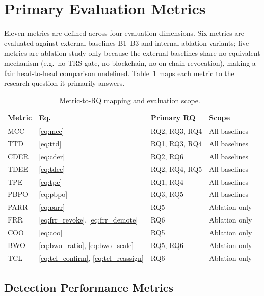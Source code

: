 \documentclass[12pt, a4paper]{report}
\begin{document}
\section{Primary Evaluation Metrics}
\label{sec:metrics}

Eleven metrics are defined across four evaluation dimensions.
Six metrics are evaluated against external baselines B1--B3 and
internal ablation variants; five metrics are ablation-study
only because the external baselines share no equivalent mechanism
(e.g.\ no TRS gate, no blockchain, no on-chain revocation), making
a fair head-to-head comparison undefined.
Table~\ref{tab:metric-rq} maps each metric to the research question
it primarily answers.

\begin{table}[H]
\centering
\caption{Metric-to-RQ mapping and evaluation scope.}
\label{tab:metric-rq}
\renewcommand{\arraystretch}{1.15}
\begin{tabular}{|l|l|l|l|}
\hline
\textbf{Metric} & \textbf{Eq.} & \textbf{Primary RQ} & \textbf{Scope} \\
\hline
MCC   & \ref{eq:mcc}          & RQ2, RQ3, RQ4        & All baselines \\
\hline
TTD   & \ref{eq:ttd}          & RQ1, RQ3, RQ4        & All baselines \\
\hline
CDER  & \ref{eq:cder}         & RQ2, RQ6             & All baselines \\
\hline
TDEE  & \ref{eq:tdee}         & RQ2, RQ4, RQ5        & All baselines \\
\hline
TPE   & \ref{eq:tpe}          & RQ1, RQ4             & All baselines \\
\hline
PBPO  & \ref{eq:pbpo}         & RQ3, RQ5             & All baselines \\
\hline
PARR  & \ref{eq:parr}         & RQ5                  & Ablation only \\
\hline
FRR   & \ref{eq:frr_revoke}, \ref{eq:frr_demote} & RQ6 & Ablation only \\
\hline
COO   & \ref{eq:coo}          & RQ5                  & Ablation only \\
\hline
BWO   & \ref{eq:bwo_ratio}, \ref{eq:bwo_scale}   & RQ5, RQ6 & Ablation only \\
\hline
TCL   & \ref{eq:tcl_confirm}, \ref{eq:tcl_reassign} & RQ6 & Ablation only \\
\hline
\end{tabular}
\end{table}

\subsection{Detection Performance Metrics}
\end{document}
